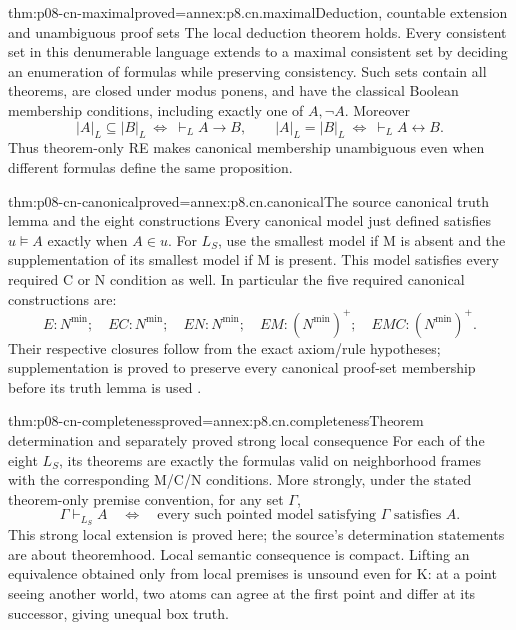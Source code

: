 \begin{hblemma}{thm:p08-cn-maximal}{proved=annex:p8.cn.maximal}{Deduction, countable extension and unambiguous proof sets}
The local deduction theorem holds. Every consistent set in this
denumerable language extends to a maximal consistent set by deciding
an enumeration of formulas while preserving consistency.
Such sets contain all theorems, are closed under modus ponens, and
have the classical Boolean membership conditions, including exactly
one of \(A,\neg A\).
Moreover
\[
 |A|_L\subseteq|B|_L\ \Longleftrightarrow\ \vdash_L A\to B,
 \qquad
 |A|_L=|B|_L\ \Longleftrightarrow\ \vdash_L A\leftrightarrow B.
\]
Thus theorem-only RE makes canonical membership unambiguous even
when different formulas define the same proposition.
\end{hblemma}

\begin{hbtheorem}{thm:p08-cn-canonical}{proved=annex:p8.cn.canonical}{The source canonical truth lemma and the eight constructions}
Every canonical model just defined satisfies
\(u\models A\) exactly when \(A\in u\).
For \(L_S\), use the smallest model if M is absent and the
supplementation of its smallest model if M is present. This model
satisfies every required C or N condition as well. In particular
the five required canonical constructions are:
\[
 E:N^{\min};\quad EC:N^{\min};\quad EN:N^{\min};\quad
 EM:(N^{\min})^+;\quad EMC:(N^{\min})^+.
\]
Their respective closures follow from the exact axiom/rule hypotheses;
supplementation is proved to preserve every canonical proof-set
membership before its truth lemma is used
\cite[theorems~9.3--9.14, pp.~252--259]{Chellas1980}.
\end{hbtheorem}

\begin{hbtheorem}{thm:p08-cn-completeness}{proved=annex:p8.cn.completeness}{Theorem determination and separately proved strong local consequence}
For each of the eight \(L_S\), its theorems are exactly the
formulas valid on neighborhood frames with the corresponding M/C/N
conditions. More strongly, under the stated theorem-only premise
convention, for any set \(\Gamma\),
\[
 \Gamma\vdash_{L_S}A
 \quad\Longleftrightarrow\quad
 \text{every such pointed model satisfying }\Gamma\text{ satisfies }A.
\]
This strong local extension is proved here; the source's determination
statements are about theoremhood. Local semantic consequence is compact.
Lifting an equivalence obtained only from local premises is unsound
even for K: at a point seeing another world, two atoms can agree at
the first point and differ at its successor, giving unequal box truth.
\end{hbtheorem}

